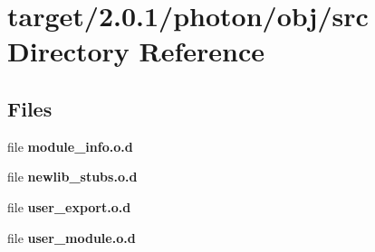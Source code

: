 \section{target/2.0.1/photon/obj/src Directory Reference}
\label{dir_fd671f00fa203234efd5cdfa14e64a86}
\subsection*{Files}
\begin{DoxyCompactItemize}
\item 
file \textbf{ module\+\_\+info.\+o.\+d}
\item 
file \textbf{ newlib\+\_\+stubs.\+o.\+d}
\item 
file \textbf{ user\+\_\+export.\+o.\+d}
\item 
file \textbf{ user\+\_\+module.\+o.\+d}
\end{DoxyCompactItemize}

